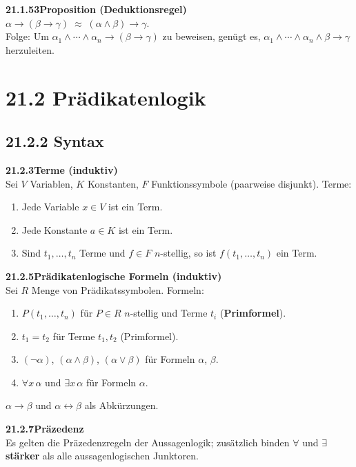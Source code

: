 \documentclass[a4paper,12pt]{article}
\newcommand{\gentry}[3]{%
  \noindent\textbf{#1\quad #2}\nopagebreak\\[0.2em]
  #3\par\smallskip
}
\begin{document}
\gentry{21.1.53}{Proposition (Deduktionsregel)}{%
  $\alpha \to (\beta \to \gamma) \;\approx\; (\alpha \land \beta) \to \gamma$.\\
  Folge: Um $\alpha_1 \land \cdots \land \alpha_n \to (\beta \to \gamma)$ zu beweisen,
  genügt es, $\alpha_1 \land \cdots \land \alpha_n \land \beta \to \gamma$ herzuleiten.
}

\section*{21.2 \quad Prädikatenlogik}

\subsection*{21.2.2 Syntax}

\gentry{21.2.3}{Terme (induktiv)}{%
  Sei $V$ Variablen, $K$ Konstanten, $F$ Funktionssymbole (paarweise disjunkt).
  Terme:
  \begin{enumerate}[label=\arabic*.,topsep=2pt,itemsep=1pt]
    \item Jede Variable $x \in V$ ist ein Term.
    \item Jede Konstante $a \in K$ ist ein Term.
    \item Sind $t_1,\ldots,t_n$ Terme und $f \in F$ $n$-stellig, so ist
          $f(t_1,\ldots,t_n)$ ein Term.
  \end{enumerate}
}

\gentry{21.2.5}{Prädikatenlogische Formeln (induktiv)}{%
  Sei $R$ Menge von Prädikatssymbolen. Formeln:
  \begin{enumerate}[label=\arabic*.,topsep=2pt,itemsep=1pt]
    \item $P(t_1,\ldots,t_n)$ für $P \in R$ $n$-stellig und Terme $t_i$
          (\textbf{Primformel}).
    \item $t_1 = t_2$ für Terme $t_1, t_2$ (Primformel).
    \item $(\lnot\alpha)$, $(\alpha \land \beta)$, $(\alpha \lor \beta)$ für Formeln $\alpha$, $\beta$.
    \item $\forall x\,\alpha$ und $\exists x\,\alpha$ für Formeln $\alpha$.
  \end{enumerate}
  $\alpha \to \beta$ und $\alpha \leftrightarrow \beta$ als Abkürzungen.
}

\gentry{21.2.7}{Präzedenz}{%
  Es gelten die Präzedenzregeln der Aussagenlogik; zusätzlich binden
  $\forall$ und $\exists$ \textbf{stärker} als alle aussagenlogischen Junktoren.
}
\end{document}
